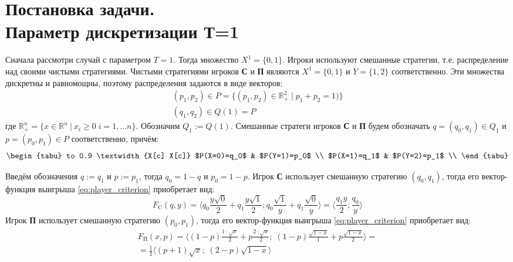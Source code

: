 \section{Постановка задачи. \\Параметр дискретизации Т=1}

Сначала рассмотри случай с параметром $T=1$. Тогда множество $X^1=\{0, 1\}$.
Игроки используют смешанные стратегии, т.е. распределение над своими чистыми 
стратегиями.
Чистыми стратегиями игроков \textbf{С} и \textbf{П} являются $X^1=\{0, 1\}$ и 
$Y=\{1,2\}$ соответственно. Эти множества дискретны и равномощны, поэтому 
распределения задаются в виде векторов: 
\begin{gather*}
	(p_1, p_2) \in P = \{
		(p_1, p_2) \in \mathbb{R}_+^2 \; | \; p_1 + p_2 = 1)
	\}
	\\
	(q_1, q_2) \in Q(1) = P	
\end{gather*}
где $
	\mathbb{R}_+^n = \{ x \in \mathbb{R}^n \: | \: 
	x_i \geqslant 0 \; i = 1, \ldots n\}
$.
Обозначим $Q_1:=Q(1)$. 
Смешанные стратеги игроков \textbf{С} и \textbf{П} будем обозначать
$q=(q_0,q_1) \in Q_1$ и $p=(p_0,p_1) \in P$ соответственно, причём:
\begin{equation}
	\begin{tabu} to 0.9 \textwidth {X[c] X[c]}
		$P(X=0)=q_0$ & $P(Y=1)=p_0$ \\
		$P(X=1)=q_1$ & $P(Y=2)=p_1$ \\
	\end{tabu}	
	\label{eq:probability_1}
\end{equation}

Введём обозначения $q := q_1$ и $p := p_1$, тогда $q_0 = 1-q$ и $p_0 = 1 - p$. 
Игрок \textbf{С} использует смешанную стратегию  $(q_0,q_1)$, тогда
его вектор-функция выигрыша \eqref{eq:player_criterion} приобретает вид: 
$$
	F_\textrm{C}(q,y)=
	\big \langle
		q_0\frac{y\sqrt{0}}{2} + 
		q_1\frac{y\sqrt{1}}{2};
		q_0\frac{\sqrt{1}}{y} +
		q_1\frac{\sqrt{0}}{y}
	\big \rangle 
	= 	
	\big \langle
		\frac{q_1y}{2};
		\frac{q_0}{y}
	\big \rangle 
$$
Игрок \textbf{П} использует смешанную стратегию  $(p_0,p_1)$, тогда
его вектор-функция выигрыша \eqref{eq:player_criterion} приобретает вид: 
\begin{gather*}
	F_\textrm{П}(x,p)=
	\big \langle 
		(1-p)\frac{1 \cdot \sqrt{x}}{2} + p \frac{2 \cdot \sqrt{x}}{2}; \;
		(1-p)\frac{\sqrt{1-x}}{1}+p\frac{\sqrt{1-x}}{2} 
	\big \rangle=
	\\
	=\frac{1}{2}
	\big \langle
		(p+1)\sqrt{x}; \;
		(2-p)\sqrt{1-x}
	\big \rangle
\end{gather*}

